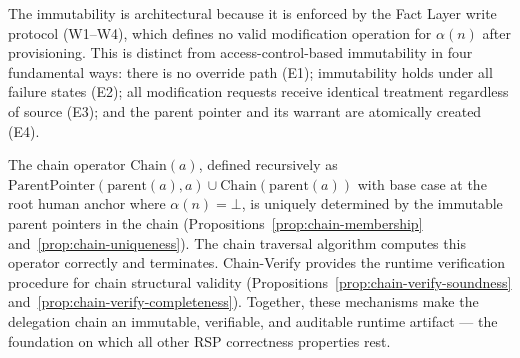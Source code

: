 The immutability is architectural because it is enforced by the Fact Layer write protocol (W1--W4), which defines no valid modification operation for $\alpha(n)$ after provisioning. This is distinct from access-control-based immutability in four fundamental ways: there is no override path (E1); immutability holds under all failure states (E2); all modification requests receive identical treatment regardless of source (E3); and the parent pointer and its warrant are atomically created (E4).

The chain operator $\mathrm{Chain}(a)$, defined recursively as $\mathrm{ParentPointer}(\mathrm{parent}(a), a) \cup \mathrm{Chain}(\mathrm{parent}(a))$ with base case at the root human anchor where $\alpha(n) = \bot$, is uniquely determined by the immutable parent pointers in the chain (Propositions~\ref{prop:chain-membership} and~\ref{prop:chain-uniqueness}). The chain traversal algorithm computes this operator correctly and terminates. Chain-Verify provides the runtime verification procedure for chain structural validity (Propositions~\ref{prop:chain-verify-soundness} and~\ref{prop:chain-verify-completeness}). Together, these mechanisms make the delegation chain an immutable, verifiable, and auditable runtime artifact --- the foundation on which all other RSP correctness properties rest.